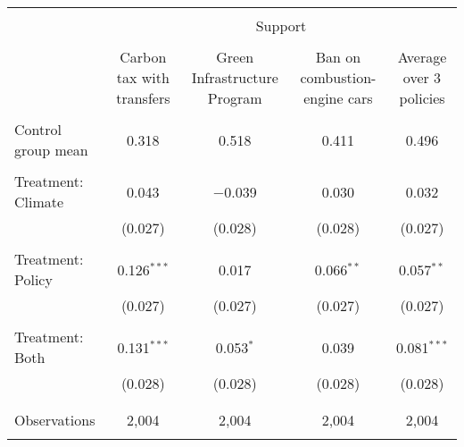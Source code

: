 
\begin{tabular}{@{\extracolsep{5pt}}lcccc} 
\\[-1.8ex]\hline 
\hline \\[-1.8ex] 
 & \multicolumn{4}{c}{Support} \\ 
\cline{2-5} 
\\[-1.8ex] & Carbon tax with transfers & Green Infrastructure Program & Ban on combustion-engine cars & Average over 3 policies \\ 
\hline \\[-1.8ex] 
 Control group mean & 0.318 & 0.518 & 0.411 & 0.496  \\ \hline \\[-1.8ex] Treatment: Climate & 0.043 & $-$0.039 & 0.030 & 0.032 \\ 
  & (0.027) & (0.028) & (0.028) & (0.027) \\ 
  & & & & \\ 
 Treatment: Policy & 0.126$^{***}$ & 0.017 & 0.066$^{**}$ & 0.057$^{**}$ \\ 
  & (0.027) & (0.027) & (0.027) & (0.027) \\ 
  & & & & \\ 
 Treatment: Both & 0.131$^{***}$ & 0.053$^{*}$ & 0.039 & 0.081$^{***}$ \\ 
  & (0.028) & (0.028) & (0.028) & (0.028) \\ 
  & & & & \\ 
\hline \\[-1.8ex] 

Observations & 2,004 & 2,004 & 2,004 & 2,004 \\ 
\hline 
\hline \\[-1.8ex] 
\end{tabular} 